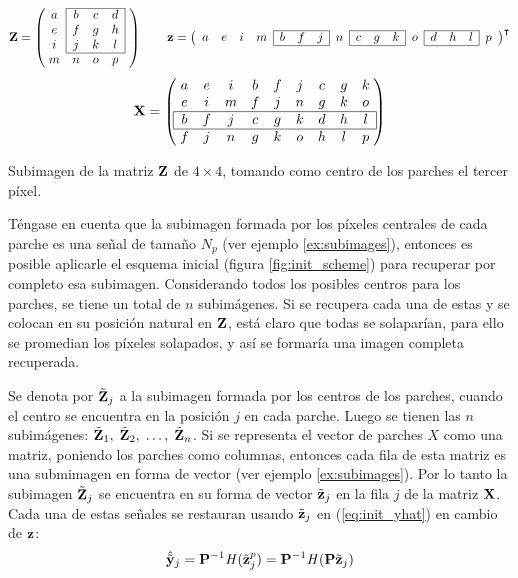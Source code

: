 \begin{example}[H]
	\[\Z = \left(
		\;\begin{matrix}
		\cline{2-4}
			a & \multicolumn{1}{|c}{b} & c & \multicolumn{1}{c|}{d}\\
			e & \multicolumn{1}{|c}{f} & g & \multicolumn{1}{c|}{h}\\
			i & \multicolumn{1}{|c}{j} & k & \multicolumn{1}{c|}{l}\\\cline{2-4}
			m & n & o & p\\
		\end{matrix}\;\;\;
	\right)
	\qquad\z = \left(
		\begin{array}{cccc|ccc|c|ccc|c|ccc|c}
			\cline{5-7}\cline{9-11}\cline{13-15}
			a & e & i & m & b & f & j & n & c & g & k & o & d & h & l & p\\
			\cline{5-7}\cline{9-11}\cline{13-15}
		\end{array}
	\right)^\intercal
	\]
	\[
	\X = \left(
		\;\begin{matrix}
			a & e & i & b & f & j & c & g & k\\
			e & i & m & f & j & n & g & k & o\\\hline
			\multicolumn{1}{|c}{b} & f & j & c & g & k & d & h & \multicolumn{1}{c|}{l}\\\hline
			f & j & n & g & k & o & h & l & p\\
		\end{matrix}\;
	\right)
	\]
	\caption{Subimagen de la matriz $\mathbf{Z}$ de $4 \times 4$, tomando como centro de los parches el tercer p\'ixel.}
	\label{ex:subimages}
\end{example}

Téngase en cuenta que la subimagen formada por los p\'ixeles centrales de cada parche es una señal de tamaño $N_p$ (ver ejemplo \ref{ex:subimages}), entonces es posible aplicarle el esquema inicial (figura \ref{fig:init_scheme}) para recuperar por completo esa subimagen. Considerando todos los posibles centros para los parches, se tiene un total de $n$ subim\'agenes. Si se recupera cada una de estas y se colocan en su posición natural en $\mathbf{Z}$, est\'a claro que todas se solapar\'ian, para ello se promedian los p\'ixeles solapados, y así se formar\'ia una imagen completa recuperada. 

Se denota por $\tilde{\mathbf{Z}}_j$ a la subimagen formada por los centros de los parches, cuando el centro se encuentra en la posici\'on $j$ en cada parche. Luego se tienen las $n$ subim\'agenes: $\tilde{\mathbf{Z}}_1,\; \tilde{\mathbf{Z}}_2,\; \dots,\; \tilde{\mathbf{Z}}_n$. Si se representa el vector de parches $X$ como una matriz, poniendo los parches como columnas, entonces cada fila de esta matriz es una submimagen en forma de vector (ver ejemplo \ref{ex:subimages}). Por lo tanto la subimagen $\tilde{\mathbf{Z}}_j$ se encuentra en su forma de vector $\tilde{\mathbf{z}}_j$ en la fila $j$ de la matriz $\mathbf{X}$. Cada una de estas señales se restauran usando $\tilde{\mathbf{z}}_j$ en (\ref{eq:init_yhat}) en cambio de $\mathbf{z}$:
\begin{equation}
	\hat{\tilde{\mathbf{y}}}_j = \mathbf{P}^{-1}\mathit{H}(\tilde{\mathbf{z}}_j^p) = \mathbf{P}^{-1}\mathit{H}(\mathbf{P}\tilde{\mathbf{z}}_j)
	\label{eq:subimage_yhat}
\end{equation}

